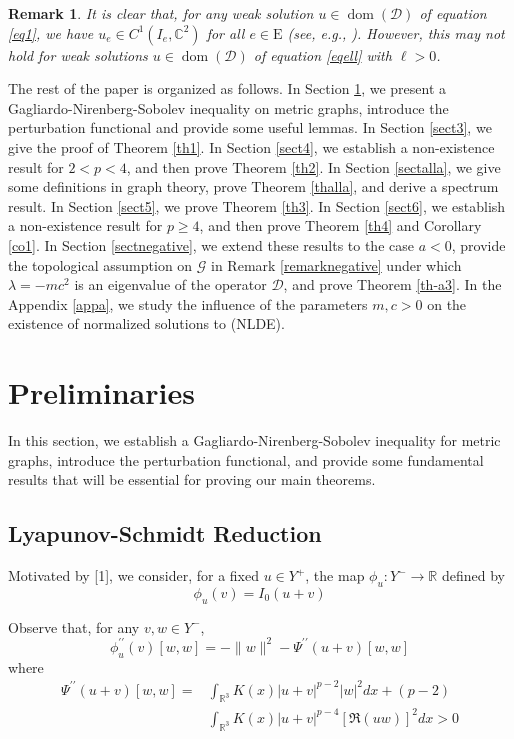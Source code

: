 \documentclass[11pt]{amsart}
\newtheorem{remark}[theorem]{Remark}
\newcommand{\D}{\mathcal{D}}
\newcommand{\G}{\mathcal{G}}
\numberwithin{equation}{section}
\begin{document}
\begin{remark}
     It is clear that, for any weak solution $u \in \operatorname{dom}(\D)$ of equation \eqref{eq1}, we have $u_e \in C^1(I_e,\mathbb{C}^{2})$ for all $e \in \mathrm{E}$ (see, e.g., \cite[Remark 6 in Chapter 8]{Ha}). However, this may not hold for weak solutions $u \in \operatorname{dom}(\D)$ of equation \eqref{eqell} with $\ell > 0$.
\end{remark}

The rest of the paper is organized as follows. In Section \ref{sect2}, we present a Gagliardo-Nirenberg-Sobolev inequality on metric graphs, introduce the perturbation functional and provide some useful lemmas. In Section \ref{sect3}, we give the proof of Theorem \ref{th1}. In Section \ref{sect4}, we establish a non-existence result for $2<p<4$, and then prove Theorem \ref{th2}. In Section \ref{sectalla}, we give some definitions in graph theory,  prove Theorem \ref{thalla}, and derive a spectrum result. In Section \ref{sect5}, we prove Theorem \ref{th3}. In Section \ref{sect6}, we establish a non-existence result for $p \geq 4$, and then prove Theorem \ref{th4} and Corollary \ref{co1}. In Section \ref{sectnegative}, we extend these results to the case $a < 0$, provide the topological assumption on $\G$ in Remark \ref{remarknegative} under which $\lambda = -mc^2$ is an eigenvalue of the operator $\D$, and prove Theorem \ref{th-a3}. In the Appendix \ref{appa}, we study the influence of the parameters $m, c > 0$ on the existence of normalized solutions to (NLDE).
\section{Preliminaries}\label{sect2}
In this section, we establish a Gagliardo-Nirenberg-Sobolev inequality for metric graphs, introduce the perturbation functional, and provide some fundamental results that will be essential for proving our main theorems.
\iffalse
\subsection{Lyapunov-Schmidt Reduction}
Motivated by [1], we consider, for a fixed $u \in Y^{+}$, the map $\phi_{u}: Y^{-} \rightarrow \mathbb{R}$ defined by
$$
\phi_{u}(v)=I_{0}(u+v)
$$

Observe that, for any $v, w \in Y^{-}$,
$$
\phi_{u}^{\prime \prime}(v)[w, w]=-\|w\|^{2}-\Psi^{\prime \prime}(u+v)[w, w]
$$
where
$$
\begin{aligned}
\Psi^{\prime \prime}(u+v)[w, w]= & \int_{\mathbb{R}^{3}} K(x)|u+v|^{p-2}|w|^{2} d x+(p-2) \\
& \int_{\mathbb{R}^{3}} K(x)|u+v|^{p-4}[\Re(u w)]^{2} d x>0
\end{aligned}
$$
\end{document}
